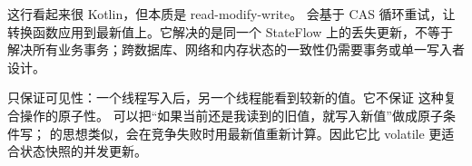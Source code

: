 \begin{pitfall}[\code{\_state.value = \_state.value.copy(...)} 不等于原子更新]
这行看起来很 Kotlin，但本质是 read-modify-write。 会基于 CAS 循环重试，让转换函数应用到最新值上。它解决的是同一个 StateFlow 上的丢失更新，不等于解决所有业务事务；跨数据库、网络和内存状态的一致性仍需要事务或单一写入者设计。
\end{pitfall}

\begin{followup}
 只保证可见性：一个线程写入后，另一个线程能看到较新的值。它不保证  这种复合操作的原子性。 可以把“如果当前还是我读到的旧值，就写入新值”做成原子条件写； 的思想类似，会在竞争失败时用最新值重新计算。因此它比 volatile 更适合状态快照的并发更新。
\end{followup}
